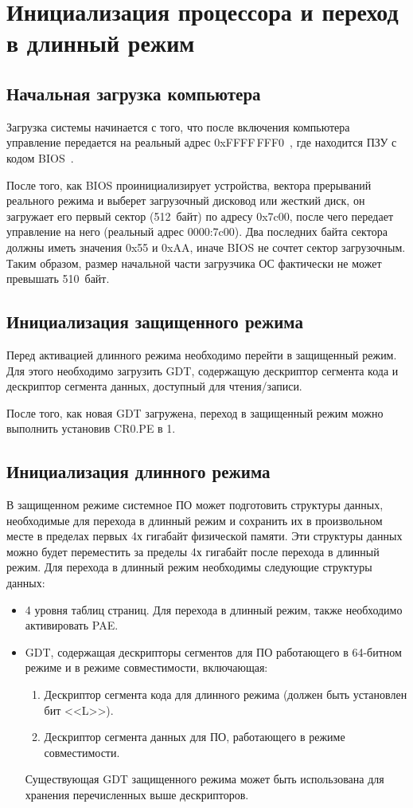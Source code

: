 \section{Инициализация процессора и переход в длинный режим}
\label{sec:long_mode_activation}

\subsection{Начальная загрузка компьютера}
Загрузка системы начинается с того, что после включения компьютера
управление передается на реальный адрес 0xFFFF\,FFF0~\cite{amd_pm_v2}, где находится
ПЗУ с кодом BIOS~\cite{mstu_os_dev_method}.

После того, как BIOS проинициализирует устройства, вектора прерываний реального
режима и выберет загрузочный дисковод или жесткий диск, он загружает его
первый сектор (512~байт) по адресу 0x7c00, после чего передает управление на
него (реальный адрес 0000:7c00). Два последних байта сектора должны иметь
значения 0x55 и 0xAA, иначе BIOS не сочтет сектор загрузочным. Таким образом,
размер начальной части загрузчика ОС фактически не может превышать 510~байт.

\subsection{Инициализация защищенного режима}
Перед активацией длинного режима необходимо перейти в защищенный режим.
Для этого необходимо загрузить GDT, содержащую дескриптор сегмента кода и
дескриптор сегмента данных, доступный для чтения/записи.

После того, как новая GDT загружена, переход в защищенный режим можно выполнить установив CR0.PE в 1.

\subsection{Инициализация длинного режима}
В защищенном режиме системное ПО может подготовить структуры данных, необходимые для перехода в
длинный режим и сохранить их в произвольном месте в пределах первых 4х гигабайт физической памяти.
Эти структуры данных можно будет переместить за пределы 4х гигабайт после перехода в длинный режим.
Для перехода в длинный режим необходимы следующие структуры данных:
\begin{itemize}
\item 4 уровня таблиц страниц. Для перехода в длинный режим, также необходимо активировать PAE.
\item GDT, содержащая дескрипторы сегментов для ПО работающего в 64-битном режиме и в
	режиме совместимости, включающая:
	\begin{enumerate}[1.]
	\item Дескриптор сегмента кода для длинного режима (должен быть установлен бит <<L>>).
	\item Дескриптор сегмента данных для ПО, работающего в режиме совместимости.
	\end{enumerate}

	Существующая GDT защищенного режима может быть использована для хранения перечисленных
	выше дескрипторов.
\end{itemize}

